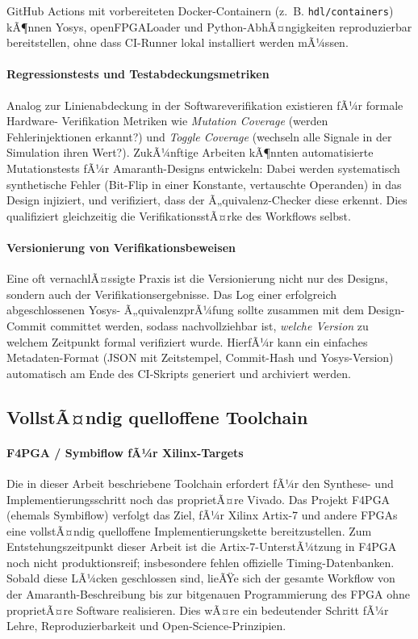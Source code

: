 ﻿\documentclass[12pt,a4paper]{report}
\begin{document}
GitHub Actions mit vorbereiteten Docker-Containern (z.~B.
\texttt{hdl/containers}) kÃ¶nnen Yosys, openFPGALoader und Python-AbhÃ¤ngigkeiten
reproduzierbar bereitstellen, ohne dass CI-Runner lokal installiert werden mÃ¼ssen.

\paragraph{Regressionstests und Testabdeckungsmetriken}
Analog zur Linienabdeckung in der Softwareverifikation existieren fÃ¼r formale Hardware-
Verifikation Metriken wie \textit{Mutation Coverage} (werden Fehlerinjektionen erkannt?)
und \textit{Toggle Coverage} (wechseln alle Signale in der Simulation ihren Wert?).
ZukÃ¼nftige Arbeiten kÃ¶nnten automatisierte Mutationstests fÃ¼r Amaranth-Designs entwickeln:
Dabei werden systematisch synthetische Fehler (Bit-Flip in einer Konstante, vertauschte
Operanden) in das Design injiziert, und verifiziert, dass der Ã„quivalenz-Checker diese
erkennt. Dies qualifiziert gleichzeitig die VerifikationsstÃ¤rke des Workflows selbst.

\paragraph{Versionierung von Verifikationsbeweisen}
Eine oft vernachlÃ¤ssigte Praxis ist die Versionierung nicht nur des Designs, sondern
auch der Verifikationsergebnisse. Das Log einer erfolgreich abgeschlossenen Yosys-
Ã„quivalenzprÃ¼fung sollte zusammen mit dem Design-Commit committet werden, sodass
nachvollziehbar ist, \textit{welche Version} zu welchem Zeitpunkt formal verifiziert
wurde. HierfÃ¼r kann ein einfaches Metadaten-Format (JSON mit Zeitstempel, Commit-Hash
und Yosys-Version) automatisch am Ende des CI-Skripts generiert und archiviert werden.

\subsection{VollstÃ¤ndig quelloffene Toolchain}

\paragraph{F4PGA / Symbiflow fÃ¼r Xilinx-Targets}
Die in dieser Arbeit beschriebene Toolchain erfordert fÃ¼r den Synthese- und
Implementierungsschritt noch das proprietÃ¤re Vivado. Das Projekt F4PGA (ehemals
Symbiflow) \cite{f4pga2024} verfolgt das Ziel, fÃ¼r Xilinx Artix-7 und andere FPGAs
eine vollstÃ¤ndig quelloffene Implementierungskette bereitzustellen. Zum
Entstehungszeitpunkt dieser Arbeit ist die Artix-7-UnterstÃ¼tzung in F4PGA noch nicht
produktionsreif; insbesondere fehlen offizielle Timing-Datenbanken. Sobald diese LÃ¼cken
geschlossen sind, lieÃŸe sich der gesamte Workflow von der Amaranth-Beschreibung bis
zur bitgenauen Programmierung des FPGA ohne proprietÃ¤re Software realisieren. Dies wÃ¤re
ein bedeutender Schritt fÃ¼r Lehre, Reproduzierbarkeit und Open-Science-Prinzipien.
\end{document}
